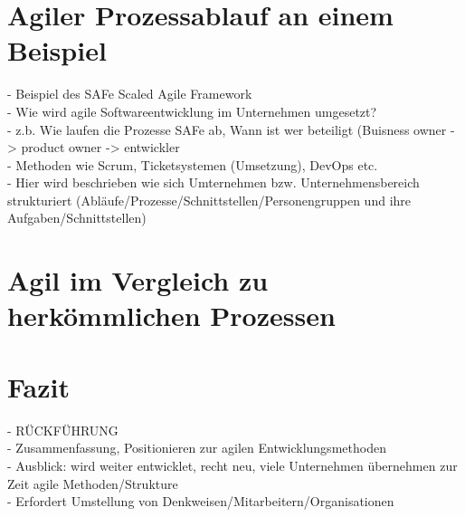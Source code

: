 \section{Agiler Prozessablauf an einem Beispiel}
- Beispiel des SAFe Scaled Agile Framework\\ 
- Wie wird agile Softwareentwicklung im Unternehmen umgesetzt? \\
- z.b. Wie laufen die Prozesse SAFe ab, Wann ist wer beteiligt (Buisness owner -> product owner -> entwickler\\
- Methoden wie Scrum, Ticketsystemen (Umsetzung), DevOps etc. \\ 
- Hier wird beschrieben wie sich Umternehmen bzw. Unternehmensbereich strukturiert (Abläufe/Prozesse/Schnittstellen/Personengruppen und ihre Aufgaben/Schnittstellen) \\ 
 
\section{Agil im Vergleich zu herkömmlichen Prozessen}\label{vergleich}



\section{Fazit}
- RÜCKFÜHRUNG\\
- Zusammenfassung, Positionieren zur agilen Entwicklungsmethoden \\
- Ausblick: wird weiter entwicklet, recht neu, viele Unternehmen übernehmen zur Zeit agile Methoden/Strukture \\
- Erfordert Umstellung von Denkweisen/Mitarbeitern/Organisationen\\
